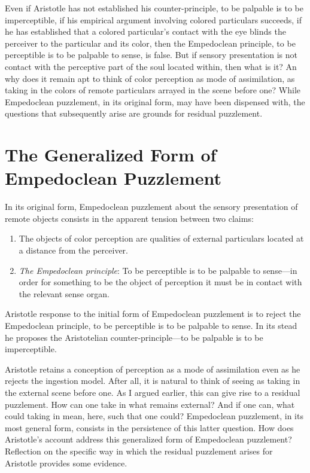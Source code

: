 Even if Aristotle has not established his counter-principle, to be palpable is to be imperceptible, if his empirical argument involving colored particulars succeeds, if he has established that a colored particular's contact with the eye blinds the perceiver to the particular and its color, then the Empedoclean principle, to be perceptible is to be palpable to sense, is false. But if sensory presentation is not contact with the perceptive part of the soul located within, then what is it? An why does it remain apt to think of color perception as mode of assimilation, as taking in the colors of remote particulars arrayed in the scene before one? While Empedoclean puzzlement, in its original form, may have been dispensed with, the questions that subsequently arise are grounds for residual puzzlement.


\section{The Generalized Form of Empedoclean Puzzlement} %
\label{sec:the_generalized_form_of_empedoclean_puzzlement}

In its original form, Empedoclean puzzlement about the sensory presentation of remote objects consists in the apparent tension between two claims:
\begin{enumerate}[(1)]
    \item The objects of color perception are qualities of external particulars located at a distance from the perceiver.
    \item \emph{The Empedoclean principle}: To be perceptible is to be palpable to sense---in order for something to be the object of perception it must be in contact with the relevant sense organ.
\end{enumerate}
Aristotle response to the initial form of Empedoclean puzzlement is to reject the Empedoclean principle, to be perceptible is to be palpable to sense. In its stead he proposes the Aristotelian counter-principle---to be palpable is to be imperceptible. 

Aristotle retains a conception of perception as a mode of assimilation even as he rejects the ingestion model. After all, it is natural to think of seeing as taking in the external scene before one. As I argued earlier, this can give rise to a residual puzzlement. How can one take in what remains external? And if one can, what could taking in mean, here, such that one could? Empedoclean puzzlement, in its most general form, consists in the persistence of this latter question. How does Aristotle's account address this generalized form of Empedoclean puzzlement? Reflection on the specific way in which the residual puzzlement arises for Aristotle provides some evidence.

